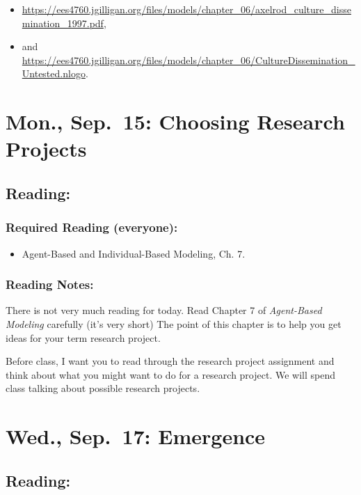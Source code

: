 \documentclass[
]{article}
\providecommand{\tightlist}{%
  \setlength{\itemsep}{0pt}\setlength{\parskip}{0pt}}
\begin{document}
\begin{itemize}
\tightlist
\item
  \url{https://ees4760.jgilligan.org/files/models/chapter_06/axelrod_culture_dissemination_1997.pdf},
\item
  and
  \url{https://ees4760.jgilligan.org/files/models/chapter_06/CultureDissemination_Untested.nlogo}.
\end{itemize}

\section{Mon., Sep.~15: Choosing Research
Projects}\label{mon.-sep.-15-choosing-research-projects}

\subsection{Reading:}\label{reading-7}

\subsubsection{Required Reading
(everyone):}\label{required-reading-everyone-6}

\begin{itemize}
\tightlist
\item
  Agent-Based and Individual-Based Modeling, Ch. 7.
\end{itemize}

\subsubsection{Reading Notes:}\label{reading-notes-6}

There is not very much reading for today. Read Chapter 7 of
\emph{Agent-Based Modeling} carefully (it's very short) The point of
this chapter is to help you get ideas for your term research project.

Before class, I want you to read through the research project assignment
and think about what you might want to do for a research project. We
will spend class talking about possible research projects.

\section{Wed., Sep.~17: Emergence}\label{wed.-sep.-17-emergence}

\subsection{Reading:}\label{reading-8}
\end{document}
